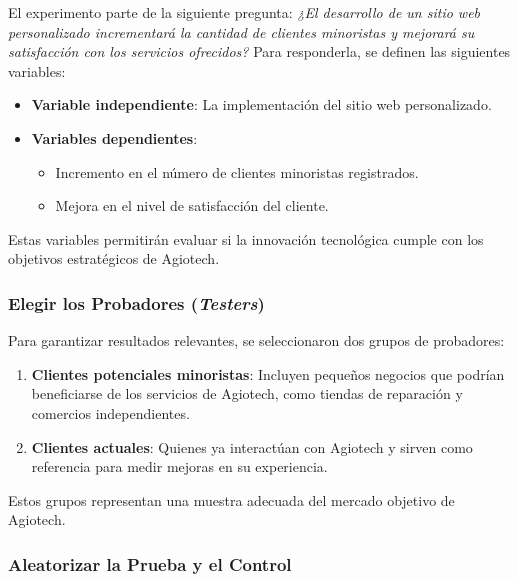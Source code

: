 El experimento parte de la siguiente pregunta: \emph{¿El desarrollo de un sitio
	web personalizado incrementará la cantidad de clientes minoristas y mejorará su
	satisfacción con los servicios ofrecidos?} Para responderla, se definen las
siguientes variables:

\begin{itemize}
	\item \textbf{Variable independiente}: La implementación del sitio web personalizado.

	\item \textbf{Variables dependientes}:

	      \begin{itemize}
		      \item Incremento en el número de clientes minoristas registrados.

		      \item Mejora en el nivel de satisfacción del cliente.
	      \end{itemize}
\end{itemize}

Estas variables permitirán evaluar si la innovación tecnológica cumple con los objetivos
estratégicos de Agiotech.

\subsubsection{\texorpdfstring{Elegir los Probadores (\emph{Testers})}{Elegir
		los Probadores (Testers)}}

Para garantizar resultados relevantes, se seleccionaron dos grupos de probadores:

\begin{enumerate}
	\item \textbf{Clientes potenciales minoristas}: Incluyen pequeños negocios que
	      podrían beneficiarse de los servicios de Agiotech, como tiendas de
	      reparación y comercios independientes.

	\item \textbf{Clientes actuales}: Quienes ya interactúan con Agiotech y sirven
	      como referencia para medir mejoras en su experiencia.
\end{enumerate}

Estos grupos representan una muestra adecuada del mercado objetivo de Agiotech.

\subsubsection{Aleatorizar la Prueba y el Control}

